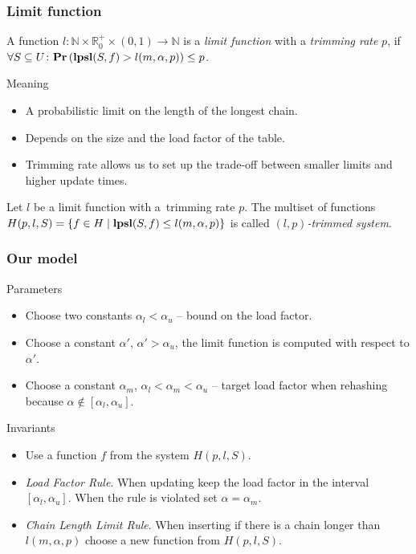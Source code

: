 \begin{frame}
	\frametitle{Limit function}
		
	\begin{definition}
		A function $l\colon \mathbb{N} \times \mathbb{R}_0^+ \times (0, 1) \rightarrow \mathbb{N}$ is a \emph{limit function} with a \emph{trimming rate} $p$, if $\forall S \subseteq U\colon \mathbf{Pr}\left(\mathbf{lpsl}(S, f) > l(m, \alpha, p)\right) \leq p$.
	\end{definition}
	
	\begin{block}{Meaning}
		\begin{itemize}
			\item A probabilistic limit on the length of the longest chain.
			\item Depends on the size and the load factor of the table.
			\item Trimming rate allows us to set up the trade-off between smaller limits and higher update times.
		\end{itemize}
	\end{block}
	
	\begin{definition}
		Let $l$ be a limit function with a~trimming rate $p$.
		The multiset of functions $H(p, l, S) = \{ f \in H \mid \mathbf{lpsl}(S, f) \leq l(m, \alpha, p) \}$ is called \emph{$(l, p)$-trimmed system}.
	\end{definition}
\end{frame}

\begin{frame}
	\frametitle{Our model}

	\begin{block}{Parameters}
		\begin{itemize}
			\item Choose two constants $\alpha_l < \alpha_u$ -- bound on the load factor.
			\item Choose a constant $\alpha'$, $\alpha' > \alpha_u$, the limit function is computed with respect to $\alpha'$.
			\item Choose a constant $\alpha_m$, $\alpha_l < \alpha_m < \alpha_u$ -- target load factor when rehashing because $\alpha \notin [\alpha_l, \alpha_u]$. 
		\end{itemize}
	\end{block}
	
	\begin{block}{Invariants}
		\begin{itemize}
			\item Use a function $f$ from the system $H(p, l, S)$.
			\item \emph{Load Factor Rule}. When updating keep the load factor in the interval $[\alpha_l, \alpha_u]$. When the rule is violated set $\alpha = \alpha_m$.
			\item \emph{Chain Length Limit Rule}. When inserting if there is a chain longer than $l(m, \alpha, p)$ choose a new function from $H(p, l, S)$.
		\end{itemize}
	\end{block}
\end{frame}

